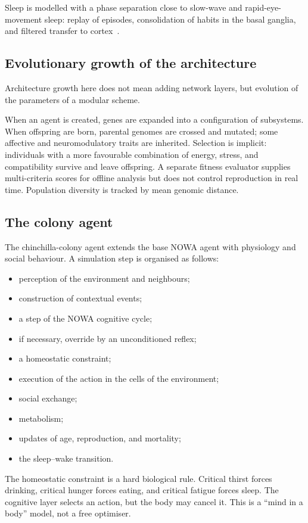 \documentclass[11pt,a4paper]{article}
\begin{document}
Sleep is modelled with a phase separation close to slow-wave and rapid-eye-movement sleep: replay of episodes, consolidation of habits in the basal ganglia, and filtered transfer to cortex~\cite{tononi2014}.

\subsection{Evolutionary growth of the architecture}

Architecture growth here does not mean adding network layers, but evolution of the parameters of a modular scheme.

When an agent is created, genes are expanded into a configuration of subsystems. When offspring are born, parental genomes are crossed and mutated; some affective and neuromodulatory traits are inherited. Selection is implicit: individuals with a more favourable combination of energy, stress, and compatibility survive and leave offspring. A separate fitness evaluator supplies multi-criteria scores for offline analysis but does not control reproduction in real time. Population diversity is tracked by mean genomic distance.

\subsection{The colony agent}

The chinchilla-colony agent extends the base NOWA agent with physiology and social behaviour. A simulation step is organised as follows:
\begin{itemize}
\item perception of the environment and neighbours;
\item construction of contextual events;
\item a step of the NOWA cognitive cycle;
\item if necessary, override by an unconditioned reflex;
\item a homeostatic constraint;
\item execution of the action in the cells of the environment;
\item social exchange;
\item metabolism;
\item updates of age, reproduction, and mortality;
\item the sleep--wake transition.
\end{itemize}

The homeostatic constraint is a hard biological rule. Critical thirst forces drinking, critical hunger forces eating, and critical fatigue forces sleep. The cognitive layer selects an action, but the body may cancel it. This is a ``mind in a body'' model, not a free optimiser.
\end{document}
